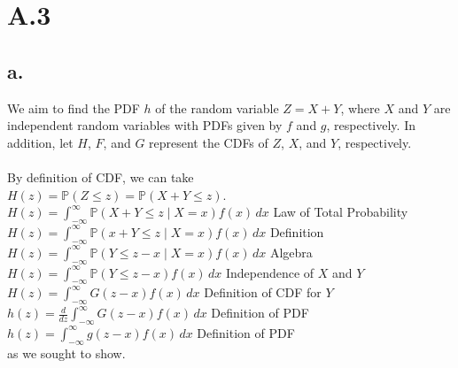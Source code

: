 \documentclass{article}
\newcommand{\1}{\mathbf{1}}
\renewcommand{\P}{\mathbb{P}}
\begin{document}
\section*{A.3}
{\Large 

\subsection*{a.}
We aim to find the PDF $h$ of the random variable $Z = X + Y$, where $X$ and $Y$ are independent random variables with PDFs given by $f$ and $g$, respectively. In addition, let $H$, $F$, and $G$ represent the CDFs of $Z$, $X$, and $Y$, respectively. \\ \\
By definition of CDF, we can take \\ 
$H(z) = \P(Z \leq z) = \P(X + Y \leq z)$. \\
$H(z) = \int_{-\infty}^{\infty} \P(X + Y \leq z \mid X = x) f(x) \,dx$ \hfill Law of Total Probability \\ 
$H(z) = \int_{-\infty}^{\infty} \P(x + Y \leq z \mid X = x) f(x) \,dx$ \hfill Definition \\
$H(z) = \int_{-\infty}^{\infty} \P(Y \leq z - x \mid X = x) f(x) \,dx$ \hfill Algebra \\ 
$H(z) = \int_{-\infty}^{\infty} \P(Y \leq z - x) f(x) \,dx$ \hfill Independence of $X$ and $Y$ \\
$H(z) = \int_{-\infty}^{\infty} G(z-x) f(x) \,dx$ \hfill Definition of CDF for $Y$ \\
$h(z) = \frac{d}{dz}\int_{-\infty}^{\infty} G(z-x) f(x) \,dx$ \hfill Definition of PDF \\
$h(z) = \int_{-\infty}^{\infty} g(z-x) f(x) \,dx$ \hfill Definition of PDF \\
as we sought to show.

}
\end{document}
